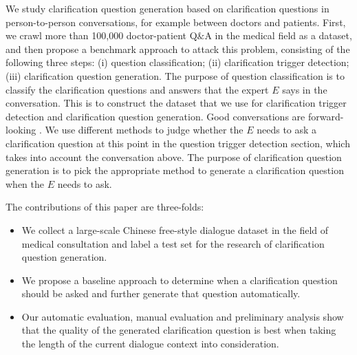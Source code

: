 We study clarification question generation based on clarification questions in person-to-person conversations, for example between doctors and patients. First, we crawl more than 100,000 doctor-patient Q$\&$A in the medical field as a dataset, and then propose a benchmark approach to attack this problem, 
consisting of the following three steps: (i) question classification; (ii) clarification trigger detection; (iii) clarification question generation. The purpose of question classification is to classify the clarification questions and answers that the expert $E$ says in the conversation. This is to construct the dataset that we use for clarification trigger detection and clarification question generation. 
Good conversations are forward-looking \citep{DBLP:journals/jsemantics/AllwoodNA92}. We use different methods to judge whether the $E$ needs to ask a clarification question at this point in the question trigger detection section, which takes into account the conversation above. The purpose of clarification question generation is to pick the appropriate method to generate a clarification question when the $E$ needs to ask.

The contributions of this paper are three-folds:
\begin{itemize}
    \item We collect a large-scale Chinese free-style dialogue dataset in the field of medical consultation and label a test set for the research of clarification question generation.
    \item We propose a baseline approach to determine when a clarification question should be asked and further generate that question automatically.
    \item Our automatic evaluation, manual evaluation and preliminary analysis show that the quality of the generated clarification question is best when taking the length of the current dialogue context into consideration. 
\end{itemize}
